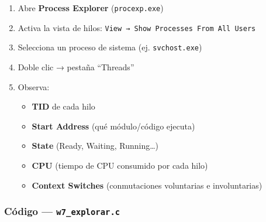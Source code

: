 \documentclass[
  spanish,
]{article}
\providecommand{\tightlist}{%
  \setlength{\itemsep}{0pt}\setlength{\parskip}{0pt}}
\begin{document}
\begin{enumerate}
\def\labelenumi{\arabic{enumi}.}
\tightlist
\item
  Abre \textbf{Process Explorer} (\texttt{procexp.exe})
\item
  Activa la vista de hilos:
  \texttt{View\ →\ Show\ Processes\ From\ All\ Users}
\item
  Selecciona un proceso de sistema (ej. \texttt{svchost.exe})
\item
  Doble clic → pestaña ``Threads''
\item
  Observa:

  \begin{itemize}
  \tightlist
  \item
    \textbf{TID} de cada hilo
  \item
    \textbf{Start Address} (qué módulo/código ejecuta)
  \item
    \textbf{State} (Ready, Waiting, Running\ldots)
  \item
    \textbf{CPU} (tiempo de CPU consumido por cada hilo)
  \item
    \textbf{Context Switches} (conmutaciones voluntarias e
    involuntarias)
  \end{itemize}
\end{enumerate}

\subsubsection{\texorpdfstring{Código ---
\texttt{w7\_explorar.c}}{Código --- w7\_explorar.c}}\label{cuxf3digo-w7_explorar.c}
\end{document}
